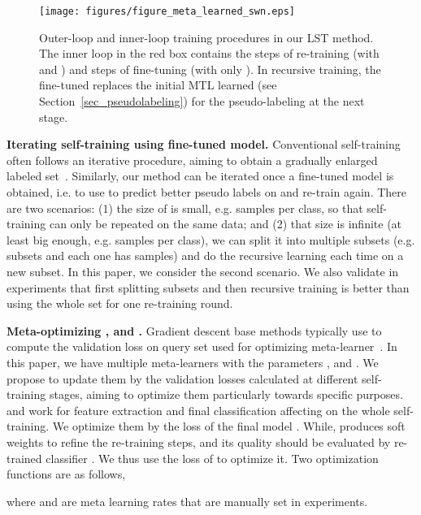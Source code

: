 \documentclass{article}
\newcommand{\myparagraph}[1]{\vspace{0.1em}\noindent\textbf{#1}}
\begin{document}
\begin{figure*}[t]
  \centering
  \texttt{[image: figures/figure\_meta\_learned\_swn.eps]}
     \caption{Outer-loop and inner-loop training procedures in our LST method.
The inner loop in the red box contains the  steps of re-training (with  and ) and  steps of fine-tuning (with only ).
     In recursive training, the fine-tuned  replaces the initial MTL learned  (see Section~\ref{sec_pseudolabeling}) for the pseudo-labeling at the next stage.}
  \label{figure_meta_learned_swn}
  \vspace{-4mm}
\end{figure*} 

\myparagraph{Iterating self-training using fine-tuned model.}
Conventional self-training often follows an iterative procedure, aiming to obtain a gradually enlarged labeled set~\cite{Yarowsky95self_training, TrigueroGH15self_labeled}.
Similarly, our method can be iterated once a fine-tuned model  is obtained, i.e. to use  to predict better pseudo labels on  and re-train  again. 
There are two scenarios: (1) the size of  is small, e.g.  samples per class, so that self-training can only be repeated on the same data; and (2) that size is infinite (at least big enough, e.g.  samples per class), we can split it into multiple subsets (e.g.  subsets and each one has  samples) and do the recursive learning each time on a new subset. In this paper, we consider the second scenario. We also validate in experiments that first splitting subsets and then recursive training is better than using the whole set for one re-training round.


\myparagraph{Meta-optimizing ,  and .}
Gradient descent base methods typically use  to compute the validation loss on query set  used for optimizing meta-learner~\cite{SunCVPR2019, FinnAL17}.
In this paper, we have multiple meta-learners with the parameters ,  and .
We propose to update them by the validation losses calculated at different self-training stages, aiming to optimize them particularly towards specific purposes. 
 and  work for feature extraction and final classification affecting on the whole self-training. We optimize them by the loss of the final model .
While,  produces soft weights to refine the re-training steps, and its quality should be evaluated by re-trained classifier .
We thus use the loss of  to optimize it.
Two optimization functions are as follows, 

where  and  are meta learning rates that are manually set in experiments.
 
\end{document}
